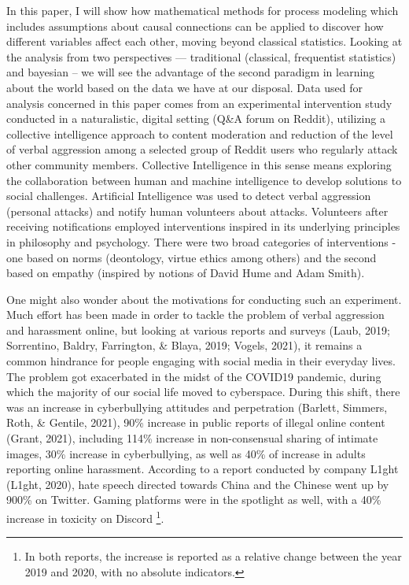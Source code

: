 \documentclass[
  10pt,
  dvipsnames,enabledeprecatedfontcommands]{scrartcl}
\begin{document}
In this paper, I will show how mathematical methods for process modeling
which includes assumptions about causal connections can be applied to
discover how different variables affect each other, moving beyond
classical statistics. Looking at the analysis from two perspectives ---
traditional (classical, frequentist statistics) and bayesian -- we will
see the advantage of the second paradigm in learning about the world
based on the data we have at our disposal. Data used for analysis
concerned in this paper comes from an experimental intervention study
conducted in a naturalistic, digital setting (Q\&A forum on Reddit),
utilizing a collective intelligence approach to content moderation and
reduction of the level of verbal aggression among a selected group of
Reddit users who regularly attack other community members. Collective
Intelligence in this sense means exploring the collaboration between
human and machine intelligence to develop solutions to social
challenges. Artificial Intelligence was used to detect verbal aggression
(personal attacks) and notify human volunteers about attacks. Volunteers
after receiving notifications employed interventions inspired in its
underlying principles in philosophy and psychology. There were two broad
categories of interventions - one based on norms (deontology, virtue
ethics among others) and the second based on empathy (inspired by
notions of David Hume and Adam Smith).

One might also wonder about the motivations for conducting such an
experiment. Much effort has been made in order to tackle the problem of
verbal aggression and harassment online, but looking at various reports
and surveys (Laub, 2019; Sorrentino, Baldry, Farrington, \& Blaya, 2019;
Vogels, 2021), it remains a common hindrance for people engaging with
social media in their everyday lives. The problem got exacerbated in the
midst of the COVID19 pandemic, during which the majority of our social
life moved to cyberspace. During this shift, there was an increase in
cyberbullying attitudes and perpetration (Barlett, Simmers, Roth, \&
Gentile, 2021), 90\% increase in public reports of illegal online
content (Grant, 2021), including 114\% increase in non-consensual
sharing of intimate images, 30\% increase in cyberbullying, as well as
40\% of increase in adults reporting online harassment. According to a
report conducted by company L1ght (L1ght, 2020), hate speech directed
towards China and the Chinese went up by 900\% on Twitter. Gaming
platforms were in the spotlight as well, with a 40\% increase in
toxicity on Discord
\footnote{In both reports, the increase is reported as a relative change between the year 2019 and 2020, with no absolute indicators.}.
\end{document}

